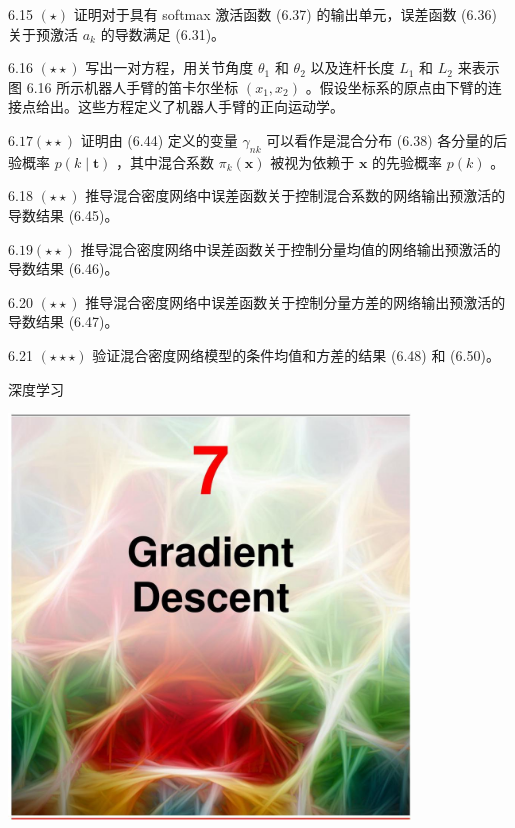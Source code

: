 \documentclass[10pt]{report}
\begin{document}
6.15 \(\left( \star \right)\) 证明对于具有 softmax 激活函数 (6.37) 的输出单元，误差函数 (6.36) 关于预激活 \({a}_{k}\) 的导数满足 (6.31)。

6.16 \(\left( {\star  \star  }\right)\) 写出一对方程，用关节角度 \({\theta }_{1}\) 和 \({\theta }_{2}\) 以及连杆长度 \({L}_{1}\) 和 \({L}_{2}\) 来表示图 6.16 所示机器人手臂的笛卡尔坐标 \(\left( {{x}_{1},{x}_{2}}\right)\) 。假设坐标系的原点由下臂的连接点给出。这些方程定义了机器人手臂的正向运动学。

\({6.17}\left( {\star  \star  }\right)\) 证明由 (6.44) 定义的变量 \({\gamma }_{nk}\) 可以看作是混合分布 (6.38) 各分量的后验概率 \(p\left( {k \mid  \mathbf{t}}\right)\) ，其中混合系数 \({\pi }_{k}\left( \mathbf{x}\right)\) 被视为依赖于 \(\mathbf{x}\) 的先验概率 \(p\left( k\right)\) 。

6.18 \(\left( {\star  \star  }\right)\) 推导混合密度网络中误差函数关于控制混合系数的网络输出预激活的导数结果 (6.45)。

\({6.19}\left( {\star  \star  }\right)\) 推导混合密度网络中误差函数关于控制分量均值的网络输出预激活的导数结果 (6.46)。

6.20 \(\left( {\star  \star  }\right)\) 推导混合密度网络中误差函数关于控制分量方差的网络输出预激活的导数结果 (6.47)。

6.21 \(\left( {\star  \star   \star  }\right)\) 验证混合密度网络模型的条件均值和方差的结果 (6.48) 和 (6.50)。

深度学习

\begin{center}
\includegraphics[max width=0.8\textwidth]{images/0194e279-9b28-703a-88f4-c3ac21e2010d_228_473_352_1075_1085_0.jpg}
\end{center}
\hspace*{3em} 
\end{document}
